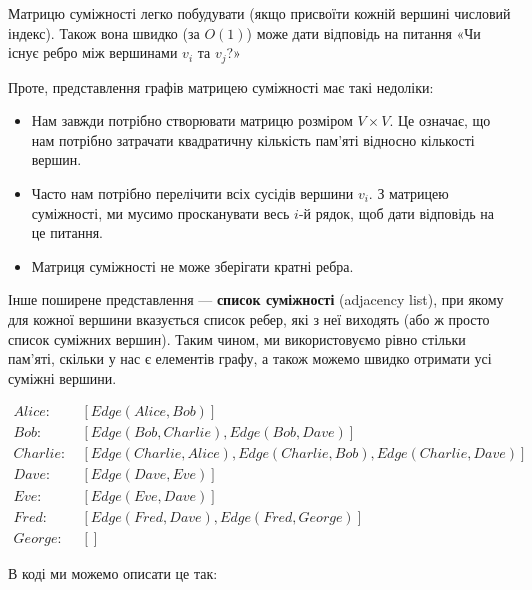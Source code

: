 \documentclass[12pt,a4paper]{report}
\begin{document}
Матрицю суміжності легко побудувати (якщо присвоїти кожній вершині числовий індекс). Також вона швидко (за \(O(1)\)) може дати відповідь на питання «Чи існує ребро між вершинами \(v_i\) та \(v_j\)?»

Проте, представлення графів матрицею суміжності має такі недоліки:
\begin{itemize}
    \item Нам завжди потрібно створювати матрицю розміром \(V \times V\). Це означає, що нам потрібно затрачати квадратичну кількість пам’яті відносно кількості вершин.
    \item Часто нам потрібно перелічити всіх сусідів вершини \(v_i\). З матрицею суміжності, ми мусимо просканувати весь \(i\)-й рядок, щоб дати відповідь на це питання.
    \item Матриця суміжності не може зберігати кратні ребра.
\end{itemize}

Інше поширене представлення --- \textbf{список суміжності} (adjacency list), при якому для кожної вершини вказується список ребер, які з неї виходять (або ж просто список суміжних вершин). Таким чином, ми використовуємо рівно стільки пам’яті, скільки у нас є елементів графу, а також можемо швидко отримати усі суміжні вершини.

\begin{align*}
    Alice:    & \  [Edge(Alice, Bob)] \\
    Bob:      & \  [Edge(Bob, Charlie), Edge(Bob, Dave)] \\
    Charlie:  & \  [Edge(Charlie, Alice), Edge(Charlie, Bob), Edge(Charlie, Dave)] \\
    Dave:     & \  [Edge(Dave, Eve)] \\
    Eve:      & \  [Edge(Eve, Dave)] \\
    Fred:     & \  [Edge(Fred, Dave), Edge(Fred, George)] \\
    George:   & \  []
\end{align*}

В коді ми можемо описати це так:


\end{document}
